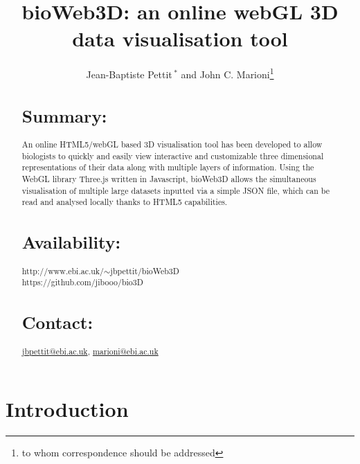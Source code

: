 \documentclass{bioinfo}
\begin{document}

\title[Application Note]{bioWeb3D: an online webGL 3D data visualisation tool}
\author[Pettit \textit{et~al}]{Jean-Baptiste Pettit\,$^{*}$ and John C. Marioni\footnote{to whom correspondence should be addressed}}
\address{EMBL-EBI, European Molecular Biology Laboratory - European Bioinformatics Institute, Cambridge, CB10 1SD, UK}



\maketitle

\begin{abstract}

\section{Summary:}
An online HTML5/webGL based 3D visualisation tool has been developed to allow biologists to quickly and easily view interactive and customizable three dimensional representations of their data along with multiple layers of information. Using the WebGL library Three.js written in Javascript, bioWeb3D allows the simultaneous visualisation of multiple large datasets inputted via a simple JSON file, which can be read and analysed locally thanks to HTML5 capabilities.

\section{Availability:}
http://www.ebi.ac.uk/$\sim$jbpettit/bioWeb3D \\ https://github.com/jibooo/bio3D

\section{Contact:} \href{jbpettit@ebi.ac.uk}{jbpettit@ebi.ac.uk}, \href{marioni@ebi.ac.uk}{marioni@ebi.ac.uk}
\end{abstract}

\section{Introduction}
\end{document}
